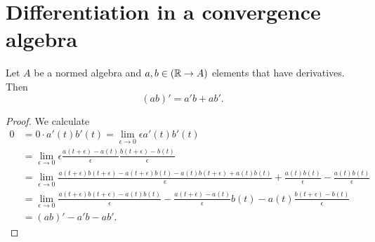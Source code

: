 \section{Differentiation in a convergence algebra}

\begin{proposition} \label{LeibnizRuleDerivativeAlgebra}
Let $A$ be a normed algebra and $a,b\in (\mathbb{R} \to A)$ elements that have derivatives. Then
\[ (ab)' = a'b + ab'. \]
\end{proposition}
\begin{proof}
We calculate
\begin{align*}
0 &= 0\cdot a'(t)b'(t) = \lim_{\epsilon \to 0} \epsilon a'(t)b'(t) \\
&= \lim_{\epsilon \to 0} \epsilon \frac{a(t+\epsilon) - a(t)}{\epsilon}\frac{b(t+\epsilon) - b(t)}{\epsilon} \\
&= \lim_{\epsilon \to 0}\frac{a(t+\epsilon)b(t+\epsilon) - a(t+\epsilon)b(t) - a(t)b(t+\epsilon) + a(t)b(t)}{\epsilon} + \frac{a(t)b(t)}{\epsilon} - \frac{a(t)b(t)}{\epsilon} \\
&= \lim_{\epsilon \to 0} \frac{a(t+\epsilon)b(t+\epsilon) - a(t)b(t)}{\epsilon} - \frac{a(t+\epsilon) - a(t)}{\epsilon}b(t) - a(t)\frac{b(t+\epsilon) - b(t)}{\epsilon} \\
&= (ab)' - a'b - ab'.
\end{align*}
\end{proof}

